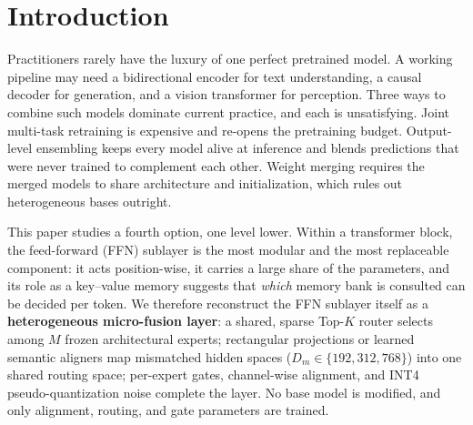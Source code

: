 \documentclass[10pt,twoside]{article}
\theoremstyle{definition}
\begin{document}
\section{Introduction}
\label{sec:intro}

Practitioners rarely have the luxury of one perfect pretrained model. A working pipeline may need a bidirectional encoder for text understanding, a causal decoder for generation, and a vision transformer for perception. Three ways to combine such models dominate current practice, and each is unsatisfying. Joint multi-task retraining is expensive and re-opens the pretraining budget. Output-level ensembling keeps every model alive at inference and blends predictions that were never trained to complement each other. Weight merging \citep{ilharco2023,yadav2023} requires the merged models to share architecture and initialization, which rules out heterogeneous bases outright.

This paper studies a fourth option, one level lower. Within a transformer block, the feed-forward (FFN) sublayer is the most modular and the most replaceable component: it acts position-wise, it carries a large share of the parameters, and its role as a key--value memory \citep{geva2021} suggests that \emph{which} memory bank is consulted can be decided per token. We therefore reconstruct the FFN sublayer itself as a \textbf{heterogeneous micro-fusion layer}: a shared, sparse Top-$K$ router selects among $M$ frozen architectural experts; rectangular projections or learned semantic aligners map mismatched hidden spaces ($D_m \in \{192, 312, 768\}$) into one shared routing space; per-expert gates, channel-wise alignment, and INT4 pseudo-quantization noise complete the layer. No base model is modified, and only alignment, routing, and gate parameters are trained.
\end{document}
